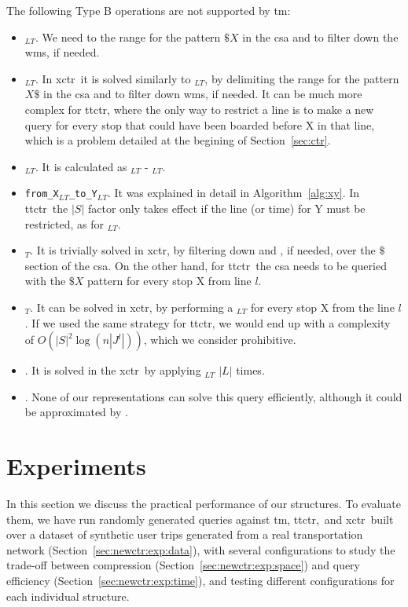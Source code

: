     \medskip
    The following Type B operations are not supported by \gls{tm}:
    
    \begin{itemize}
        \item \texttt{\startX$_{LT}$}. We need to the range for the pattern $\$X$ in the \gls{csa} and to filter down the \gls{wm}s, if needed.
        \item \texttt{\endX$_{LT}$}. In \gls{xctr}~it is solved similarly to \texttt{\startX$_{LT}$}, by delimiting the range for the pattern $X\$$ in the \gls{csa} and to filter down \gls{wm}s, if needed. It can be much more complex for \gls{ttctr}, where the only way to restrict a line is to make a new query for every stop that could have been boarded before X in that line, which is a problem detailed at the begining of Section~\ref{sec:ctr}.
        \item \texttt{\switchX$_{LT}$}. It is calculated as \boardX$_{LT}$ - \startX$_{LT}$.
        \item \texttt{from\_X$_{LT}$\_to\_Y$_{LT}$}. It was explained in detail in Algorithm~\ref{alg:xy}. In \gls{ttctr}~the $|S|$ factor only takes effect if the line (or time) for Y must be restricted, as for \texttt{\endX$_{LT}$}.
        \item \texttt{\startL$_T$}. It is trivially solved in \gls{xctr}, by filtering down  and , if needed, over the $\$$ section of the \gls{csa}. On the other hand, for \gls{ttctr}~the \gls{csa} needs to be queried with the $\$X$ pattern for every stop X from line $l$.
        \item \texttt{\endL$_T$}. It can be solved in \gls{xctr}, by performing a \endX$_{LT}$ for every stop X from the line $l$. If we used the same strategy for \gls{ttctr}, we would end up with a complexity of $O(|S|^2\log(n|J^l|))$, which we consider prohibitive.
        \item \texttt{\startT}. It is solved in the \gls{xctr}~by applying \texttt{\startX$_{LT}$} $|L|$ times.
        \item \texttt{\endT}. None of our representations can solve this query efficiently, although it could be approximated by \texttt{\startT}.
    \end{itemize}
	
\section{Experiments}
\label{sec:newctr:exp}
	In this section we discuss the practical performance of our structures. To evaluate them, we have run randomly generated queries against \gls{tm}, \gls{ttctr},~and \gls{xctr}~built over a dataset of synthetic user trips generated from a real transportation network (Section~\ref{sec:newctr:exp:data}), with several configurations to study the trade-off between compression (Section~\ref{sec:newctr:exp:space}) and query efficiency (Section~\ref{sec:newctr:exp:time}), and testing different configurations for each individual structure.

